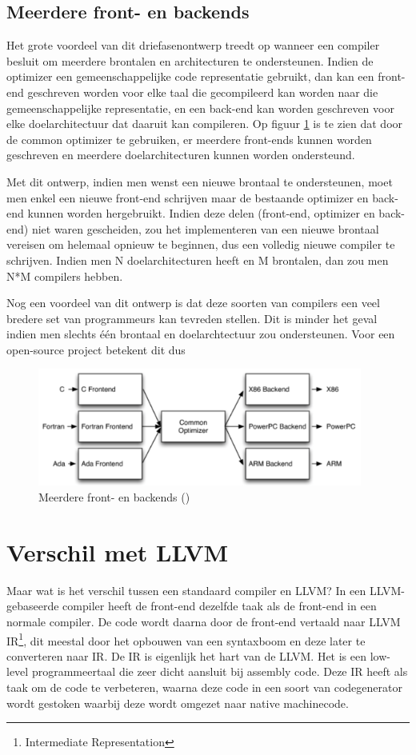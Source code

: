 \subsection{Meerdere front- en backends}
Het grote voordeel van dit driefasenontwerp treedt op wanneer een compiler besluit om meerdere brontalen en architecturen te ondersteunen. Indien de optimizer een gemeenschappelijke code representatie gebruikt, dan kan een front-end geschreven worden voor elke taal die gecompileerd kan worden naar die gemeenschappelijke representatie, en een back-end kan worden geschreven voor elke doelarchitectuur dat daaruit kan compileren. Op figuur \ref{fig:llvmdriefasen} is te zien dat door de common optimizer te gebruiken, er meerdere front-ends kunnen worden geschreven en meerdere doelarchitecturen kunnen worden ondersteund.

Met dit ontwerp, indien men wenst een nieuwe brontaal te ondersteunen, moet men enkel een nieuwe front-end schrijven maar de bestaande optimizer en back-end kunnen worden hergebruikt. Indien deze delen (front-end, optimizer en back-end) niet waren gescheiden, zou het implementeren van een nieuwe brontaal vereisen om helemaal opnieuw te beginnen, dus een volledig nieuwe compiler te schrijven. Indien men N doelarchitecturen heeft en M brontalen, dan zou men N*M compilers hebben.

Nog een voordeel van dit ontwerp is dat deze soorten van compilers een veel bredere set van programmeurs kan tevreden stellen. Dit is minder het geval indien men slechts één brontaal en doelarchtectuur zou ondersteunen. Voor een open-source project betekent dit dus 

\begin{figure} [ht]
	\centering
	\includegraphics[width=0.95\textwidth]{img/llvmdriefasen}
	\caption{Meerdere front- en backends (\cite{aosa})}
	\label{fig:llvmdriefasen}
\end{figure}

\section{Verschil met LLVM}
Maar wat is het verschil tussen een standaard compiler en LLVM? 
\newline
In een LLVM-gebaseerde compiler heeft de front-end dezelfde taak als de front-end in een normale compiler. De code wordt daarna door de front-end vertaald naar LLVM IR\footnote{Intermediate Representation}, dit meestal door het opbouwen van een syntaxboom en deze later te converteren naar IR. De IR is eigenlijk het hart van de LLVM. Het is een low-level programmeertaal die zeer dicht aansluit bij assembly code. Deze IR heeft als taak om de code te verbeteren, waarna deze code in een soort van codegenerator wordt gestoken waarbij deze wordt omgezet naar native machinecode. 


